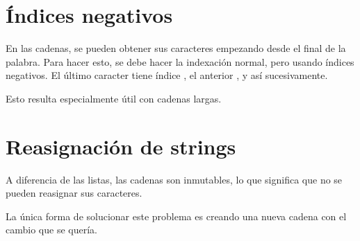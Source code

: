 \section{Índices negativos}

En las cadenas, se pueden obtener sus caracteres empezando desde el final de la palabra.
Para hacer esto, se debe hacer la indexación normal, pero usando índices negativos.
El último caracter tiene índice , el anterior , y así sucesivamente.


Esto resulta especialmente útil con cadenas largas.

\section{Reasignación de strings}

A diferencia de las listas, las cadenas son inmutables, lo que significa que no se pueden reasignar sus caracteres.


La única forma de solucionar este problema es creando una nueva cadena con el cambio que se quería.


\clearpage